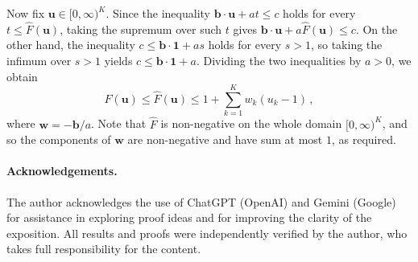 \documentclass[3p, authoryear, 10pt]{elsarticle}%
\newcommand{\one}{\mathbf{1}}
\begin{document}
Now fix $\mathbf u\in[0,\infty)^K$. Since the inequality $\mathbf b\cdot\mathbf u + a t \le c$ holds for every $t\le \hat F(\mathbf u)$, taking the supremum over such $t$ gives $\mathbf b\cdot\mathbf u + a\hat F(\mathbf u)\leq c$. On the other hand, the inequality $c\leq \mathbf b\cdot\one + a s$ holds for every $s>1$, so taking the infimum over $s>1$ yields $c\le \mathbf b\cdot\one + a$.
Dividing the two inequalities by $a>0$, we obtain
$$F(\mathbf u) \leq \hat F(\mathbf u)\leq 1+\sum_{k=1}^K w_k(u_k-1)\,,$$
where $\mathbf{w}=-\mathbf{b}/a$. Note that $\hat F$ is non-negative on the whole domain $[0,\infty)^K$, and so the components of $\mathbf{w}$ are non-negative and have sum at most $1$, as required. 

\paragraph{Acknowledgements.} The author acknowledges the use of ChatGPT (OpenAI) and Gemini (Google) for assistance in exploring proof ideas and for improving the clarity of the exposition. All results and proofs were independently verified by the author, who takes full responsibility for the content.

\end{document}
